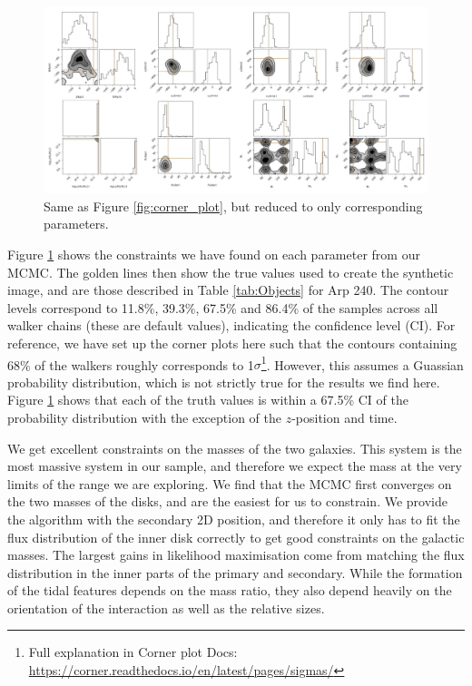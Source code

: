 \begin{figure}
    \centering
    \includegraphics[width=\textwidth]{Chapter1/figures/Arp240-red-corner.pdf}
    \caption[Same as Figure \ref{fig:corner_plot}, but reduced to only corresponding parameters.]{Same as Figure \ref{fig:corner_plot}, but reduced to only corresponding parameters.}
    \label{fig:arp240_corner_plot}
\end{figure}

Figure \ref{fig:arp240_corner_plot} shows the constraints we have found on each parameter from our MCMC. The golden lines then show the true values used to create the synthetic image, and are those described in Table \ref{tab:Objects} for Arp 240. The contour levels correspond to 11.8\%, 39.3\%, 67.5\% and 86.4\% of the samples across all walker chains (these are default values), indicating the confidence level (CI). For reference, we have set up the corner plots here such that the contours containing 68\% of the walkers roughly corresponds to 1$\sigma$\footnote{Full explanation in Corner plot Docs: \url{https://corner.readthedocs.io/en/latest/pages/sigmas/}}. However, this assumes a Guassian probability distribution, which is not strictly true for the results we find here. Figure \ref{fig:arp240_corner_plot} shows that each of the truth values is within a 67.5\% CI of the probability distribution with the exception of the $z$-position and time.

We get excellent constraints on the masses of the two galaxies. This system is the most massive system in our sample, and therefore we expect the mass at the very limits of the range we are exploring. We find that the MCMC first converges on the two masses of the disks, and are the easiest for us to constrain. We provide the algorithm with the secondary 2D position, and therefore it only has to fit the flux distribution of the inner disk correctly to get good constraints on the galactic masses. The largest gains in likelihood maximisation come from matching the flux distribution in the inner parts of the primary and secondary. While the formation of the tidal features depends on the mass ratio, they also depend heavily on the orientation of the interaction as well as the relative sizes.

